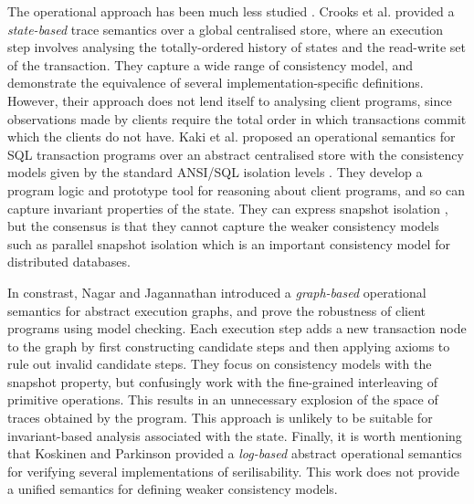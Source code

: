 The operational approach has been much  less studied
\cite{seebelieve,alonetogether,sureshConcur}.  Crooks et
al. \citet{seebelieve} provided a {\em state-based} trace semantics
over a global centralised store, where an execution step involves
analysing the totally-ordered history of states and the read-write set
of the transaction.  They capture a wide range of consistency model,
and demonstrate the equivalence of several implementation-specific
definitions.  However, their approach does not lend itself to
analysing client programs, since observations made by clients require
the total order in which transactions commit which the clients do not
have. Kaki et al. \citet{alonetogether} proposed an operational
semantics for SQL transaction programs over an abstract centralised
store with the consistency models given by the standard ANSI/SQL
isolation levels \cite{si}. They develop a program logic and prototype
tool for reasoning about client programs, and so can capture invariant
properties of the state. They can express snapshot isolation
\cite{si}, but the consensus is that they cannot capture the weaker
consistency models such as parallel snapshot isolation \cite{PSI}
which is an important consistency model for distributed databases.

In constrast, Nagar and Jagannathan \citet{sureshConcur} introduced a {\em
  graph-based} operational semantics for abstract execution graphs,
and prove the robustness of client programs using model checking. Each
execution step adds a new transaction node to the graph by first
constructing candidate steps and then applying axioms to rule out
invalid candidate steps.  They focus on consistency models with the
snapshot property, but confusingly work with the fine-grained
interleaving of primitive operations.  This results in an unnecessary
explosion of the space of traces obtained by the program.  This
approach is unlikely to be suitable for invariant-based analysis
associated with the state.  Finally, it is worth mentioning that
Koskinen and Parkinson \citet{push-pull} provided a {\em log-based}
abstract operational semantics for verifying several implementations
of serilisability.  This work does not provide a unified semantics for
defining  weaker consistency models.





